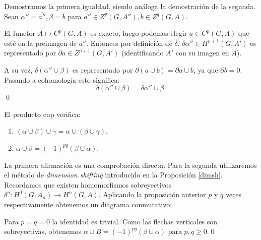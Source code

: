 \documentclass[a4paper,12pt, leqno]{article}
\begin{document}
	\begin{dem}
		Demostramos la primera igualdad, siendo análoga la demostración de la segunda. Sean $\alpha''=\overline{a''},\beta=\overline{b}$ para $a''\in Z^p(G,A''),b\in Z^q(G,A)$. 
		
		El functor $A \mapsto C^p(G,A)$ es exacto, luego podemos elegir $a\in C^p(G,A)$ que esté en la preimagen de $a''$.	Entonces por definición de $\delta$, $\delta \alpha''\in H^{p+1}(G,A')$ es representado por $\partial a\in Z^{p+1}(G,A')$  (identificando $A'$ con su imagen en $A$).
		
		A su vez, $\delta(\alpha'' \cup \beta)$ es representado por $\partial(a \cup b)=\partial a \cup b$, ya que $\partial b = 0$. Pasando a cohomología esto significa:
		\begin{equation*}
		\delta(\alpha'' \cup \beta)=\delta \alpha'' \cup \beta.
		\end{equation*}\qed
	\end{dem}
	\begin{prop}
		El producto cup verifica:
		
		\begin{enumerate}[label = \roman*)]
			\item $(\alpha \cup \beta) \cup \gamma = \alpha \cup (\beta \cup \gamma)$.
			\item $\alpha \cup \beta = (-1)^{pq}(\beta \cup \alpha)$.
		\end{enumerate}
	\end{prop}
	\begin{dem}
		La primera afirmación es una comprobación directa. Para la segunda utilizaremos el método de \textit{dimension shifting} introducido en la Proposición \ref{dimsh}. Recordamos que existen homomorfismos sobreyectivos $\delta^n: H^0(G,A_n)\rightarrow H^n(G,A).$ Aplicando la proposición anterior $p$ y $q$ veces respectivamente obtenemos un diagrama conmutativo:
		\begin{center}
		\end{center}
		Para $p=q=0$ la identidad es trivial. Como las flechas verticales son sobreyectivas, obtenemos $\alpha \cup B=(-1)^{pq}(\beta \cup \alpha)$ para $p,q \geq 0$.\qed
	\end{dem}
\end{document}
